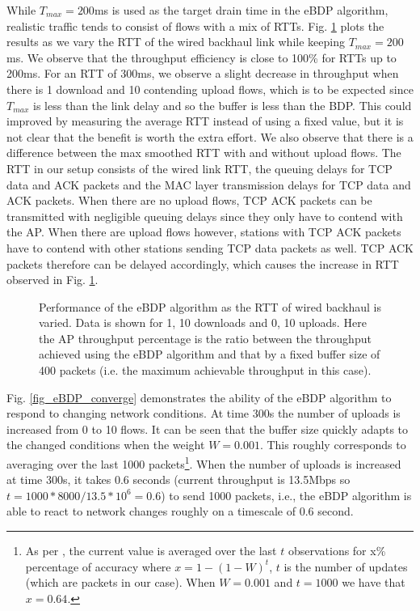 \documentclass[10pt,twocolumn, journal]{IEEEtran}
\begin{document}
While $T_{max}=200$ms is used as the target drain time in the eBDP algorithm, realistic
traffic tends to consist of flows with a mix of RTTs. Fig. \ref{fig_eBDP_varyrtt} plots
the results as we vary the RTT of the wired backhaul link while keeping $T_{max}=200$ms.
We observe that the throughput efficiency is close to 100\% for RTTs up to 200ms. For an RTT of 300ms, we observe a slight decrease in throughput when there is 1 download and 10
contending upload flows, which is to be expected since $T_{max}$ is less than the link
delay and so the buffer is less than the BDP. This could improved by measuring the
average RTT instead of using a fixed value, but it is not clear that the benefit is worth
the extra effort. We also observe that there is a difference between the max smoothed RTT
with and without upload flows. The RTT in our setup consists of the wired link RTT, the
queuing delays for TCP data and ACK packets and the MAC layer transmission delays for
TCP data and ACK packets. When there are no upload flows, TCP ACK packets can be
transmitted with negligible queuing delays since they only have to contend with the AP.
When there are upload flows however, stations with TCP ACK packets have to contend with
other stations sending TCP data packets as well. TCP ACK packets therefore can be delayed
accordingly, which causes the increase in RTT observed in Fig. \ref{fig_eBDP_varyrtt}.


\begin{figure}[tb]
   \centering
   \caption{Performance of the eBDP algorithm as the RTT of wired backhaul is varied.
   Data is shown for 1, 10 downloads and 0, 10 uploads.    Here the AP throughput percentage is the ratio between the throughput achieved using the eBDP algorithm and that by a fixed buffer size of 400 packets (i.e. the maximum achievable throughput in this case).}
   \label{fig_eBDP_varyrtt}
\end{figure}


Fig. \ref{fig_eBDP_converge} demonstrates the ability of the eBDP algorithm to respond to
changing network conditions.   At time 300s the number of uploads is increased from 0 to
10 flows.  It can be seen that the buffer size quickly adapts to the changed conditions
when the weight $W=0.001$. This roughly corresponds to averaging over the last 1000
packets\footnote{As per \cite{Chatfield_2004}, the current value is averaged over the
last $t$ observations for x\% percentage of accuracy where $x=1-(1-W)^t$, $t$ is the
number of updates (which are packets in our case). When $W=0.001$ and $t=1000$ we have
that $x=0.64.$}. When the number of uploads is increased at time 300s, it takes 0.6
seconds (current throughput is 13.5Mbps so $t=1000*8000/13.5*10^6=0.6$) to send 1000
packets, i.e., the eBDP algorithm is able to react to network changes roughly on a
timescale of 0.6 second.
\end{document}
